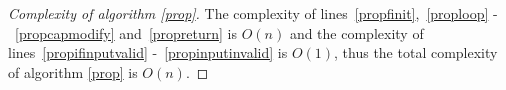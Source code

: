 \begin{proof}[Complexity of algorithm \ref{prop}]
   The complexity of lines~\ref{propfinit},~\ref{proploop} -~\ref{propcapmodify} and~\ref{propreturn} is $O(n)$ and the
   complexity of lines~\ref{propifinputvalid} -~\ref{propinputinvalid} is $O(1)$, thus the total complexity of algorithm
   \ref{prop} is $O(n)$.
\end{proof}
